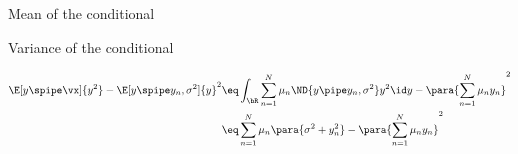 \documentclass{article}
\begin{document}
\begin{question}
\begin{qsubsection}{Mean of the conditional}
	\end{qsubsection}

	\begin{qsubsection}{Variance of the conditional}

		\begin{align*}
			\E[y \spipe \vx]{y^2} - \E[y \spipe y_n, \sigma^2]{y}^2 &\eq	\int_\bR \sum_{n = 1}^N \mu_n \ND{y \pipe y_n, \sigma^2} y^2 \id y - \para{\sum_{n = 1}^N \mu_n y_n}^2 \\
			&\eq	\sum_{n = 1}^N \mu_n \para{\sigma^2 + y_n^2} - \para{\sum_{n = 1}^N \mu_n y_n}^2
		\end{align*}

	\end{qsubsection}

\end{question}
\end{document}
